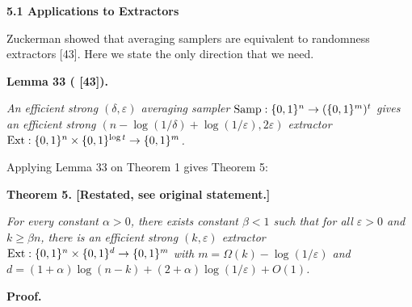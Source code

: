 \documentclass[10pt,a4paper]{article}
\begin{document}
\par\medskip\noindent\textbf{
5.1 Applications to Extractors}\par




Zuckerman showed that averaging samplers are equivalent to randomness extractors [43]. Here we state the only direction that we need.\par





\par\medskip\noindent\textbf{
\textbf{Lemma 33}\textbf{ }(
[43])\textbf{.}
}\par



\emph{An efficient strong $(\delta,\varepsilon)$ averaging sampler $\textup{{Samp}}:\{0,1\}^{n}\to(\{0,1\}^{m})^{t}$ gives an efficient strong $(n-\log(1/\delta)+\log(1/\varepsilon),2\varepsilon)$ extractor $\textup{{Ext}}:\{0,1\}^{n}\times\{0,1\}^{\log t}\to\{0,1\}^{m}$.}\par






Applying Lemma 33 on Theorem 1 gives Theorem 5:\par






\par\medskip\noindent\textbf{
\textbf{Theorem 5}\textbf{.}
[Restated, see original statement.]}\par



\emph{For every constant $\alpha>0$, there exists constant $\beta<1$ such that for all $\varepsilon>0$ and $k\geq\beta n$, there is an efficient strong $(k,\varepsilon)$ extractor $\textup{{Ext}}:\{0,1\}^{n}\times\{0,1\}^{d}\to\{0,1\}^{m}$ with $m=\Omega(k)-\log(1/\varepsilon)$ and $d=(1+\alpha)\log(n-k)+(2+\alpha)\log(1/\varepsilon)+O(1)$.}\par







\par\medskip\noindent\textbf{Proof.}\par
\end{document}

